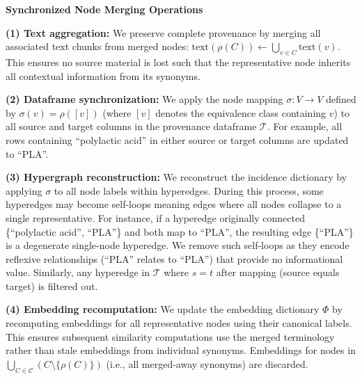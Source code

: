 \documentclass{article}
\begin{document}
\begin{mdframed}[linewidth=1pt, linecolor=black!60, backgroundcolor=gray!5]
\textbf{Synchronized Node Merging Operations}

\medskip

\noindent\textbf{(1) Text aggregation:} We preserve complete provenance by merging all associated text chunks from merged nodes: $\text{text}(\rho(C)) \leftarrow \bigcup_{v \in C} \text{text}(v)$. This ensures no source material is lost such that the representative node inherits all contextual information from its synonyms.

\medskip

\noindent\textbf{(2) Dataframe synchronization:} We apply the node mapping $\sigma: V \to V$ defined by $\sigma(v) = \rho([v])$ (where $[v]$ denotes the equivalence class containing $v$) to all source and target columns in the provenance dataframe $\mathcal{T}$. For example, all rows containing ``polylactic acid'' in either source or target columns are updated to ``PLA''.

\medskip

\noindent\textbf{(3) Hypergraph reconstruction:} We reconstruct the incidence dictionary by applying $\sigma$ to all node labels within hyperedges. During this process, some hyperedges may become self-loops meaning edges where all nodes collapse to a single representative. For instance, if a hyperedge originally connected \{``polylactic acid'', ``PLA''\} and both map to ``PLA'', the resulting edge \{``PLA''\} is a degenerate single-node hyperedge. We remove such self-loops as they encode reflexive relationships (``PLA'' relates to ``PLA'') that provide no informational value. Similarly, any hyperedge in $\mathcal{T}$ where $s = t$ after mapping (source equals target) is filtered out.

\medskip

\noindent\textbf{(4) Embedding recomputation:} We update the embedding dictionary $\Phi$ by recomputing embeddings for all representative nodes using their canonical labels. This ensures subsequent similarity computations use the merged terminology rather than stale embeddings from individual synonyms. Embeddings for nodes in $\bigcup_{C \in \mathcal{C}} (C \setminus \{\rho(C)\})$ (i.e., all merged-away synonyms) are discarded.
\end{mdframed}
\end{document}
